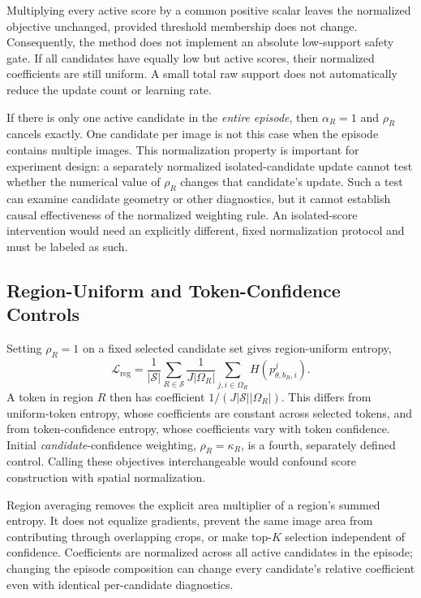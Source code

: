 Multiplying every active score by a common positive scalar leaves the normalized objective unchanged, provided threshold membership does not change. Consequently, the method does not implement an absolute low-support safety gate. If all candidates have equally low but active scores, their normalized coefficients are still uniform. A small total raw support does not automatically reduce the update count or learning rate.

If there is only one active candidate in the \emph{entire episode}, then $\alpha_R=1$ and $\rho_R$ cancels exactly. One candidate per image is not this case when the episode contains multiple images. This normalization property is important for experiment design: a separately normalized isolated-candidate update cannot test whether the numerical value of $\rho_R$ changes that candidate's update. Such a test can examine candidate geometry or other diagnostics, but it cannot establish causal effectiveness of the normalized weighting rule. An isolated-score intervention would need an explicitly different, fixed normalization protocol and must be labeled as such.

\subsection{Region-Uniform and Token-Confidence Controls}
Setting $\rho_R=1$ on a fixed selected candidate set gives region-uniform entropy,
\begin{equation}
\mathcal L_{\mathrm{reg}}=\frac{1}{|\mathcal S|}
\sum_{R\in\mathcal S}\frac{1}{J|\Omega_R|}
\sum_{j,i\in\Omega_R}H(p^j_{\theta,b_R,i}).
\end{equation}
A token in region $R$ then has coefficient $1/(J|\mathcal S||\Omega_R|)$. This differs from uniform-token entropy, whose coefficients are constant across selected tokens, and from token-confidence entropy, whose coefficients vary with token confidence. Initial \emph{candidate}-confidence weighting, $\rho_R=\kappa_R$, is a fourth, separately defined control. Calling these objectives interchangeable would confound score construction with spatial normalization.

Region averaging removes the explicit area multiplier of a region's summed entropy. It does not equalize gradients, prevent the same image area from contributing through overlapping crops, or make top-$K$ selection independent of confidence. Coefficients are normalized across all active candidates in the episode; changing the episode composition can change every candidate's relative coefficient even with identical per-candidate diagnostics.

